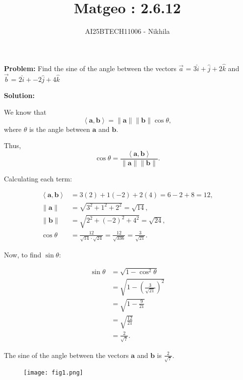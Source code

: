 \documentclass[journal]{IEEEtran}
\newcommand{\innerproduct}[2]{\left\langle #1, #2 \right\rangle}
\begin{document}
\title{Matgeo : 2.6.12}
\author{AI25BTECH11006 - Nikhila}
\maketitle

\textbf{Problem:} Find the sine of the angle between the vectors $\vec{a}$ = $3\hat{i} + \hat{j} + 2\hat{k}$ and \\ \hspace*{1.3em} $\vec{b}$ = $2\hat{i} + -2\hat{j} + 4\hat{k}$
\vspace{1em}

\textbf{Solution:}

We know that
\[
\innerproduct{\bm{a}}{\bm{b}} = \|\bm{a}\| \|\bm{b}\| \cos\theta,
\]
\hspace*{1.1em} where \(\theta\) is the angle between \(\bm{a}\) and \(\bm{b}\).

Thus,
\[
\cos\theta = \frac{\innerproduct{\bm{a}}{\bm{b}}}{\|\bm{a}\| \|\bm{b}\|}.
\]

Calculating each term:

\begin{align}
\innerproduct{\bm{a}}{\bm{b}} &= 3(2) + 1(-2) + 2(4) = 6 - 2 + 8 = 12, \\
\|\bm{a}\| &= \sqrt{3^2 + 1^2 + 2^2} = \sqrt{14}, \\
\|\bm{b}\| &= \sqrt{2^2 + (-2)^2 + 4^2} = \sqrt{24}, \\
\cos\theta &= \frac{12}{\sqrt{14} \cdot \sqrt{24}} = \frac{12}{\sqrt{336}} = \frac{3}{\sqrt{21}}.
\end{align}

Now, to find \(\sin\theta\):

\begin{align}
\sin\theta &= \sqrt{1 - \cos^2\theta} \\
&= \sqrt{1 - \left(\frac{3}{\sqrt{21}}\right)^2} \\
&= \sqrt{1 - \frac{9}{21}} \\
&= \sqrt{\frac{12}{21}} \\
&= \frac{2}{\sqrt{7}}.
\end{align}

The sine of the angle between the vectors \(\bm{a}\) and \(\bm{b}\) is \(\frac{2}{\sqrt{7}}\).

\begin{figure}[h!]
   \centering
   \texttt{[image: fig1.png]}
   \caption{}
   \label{}
\end{figure}
\end{document}
